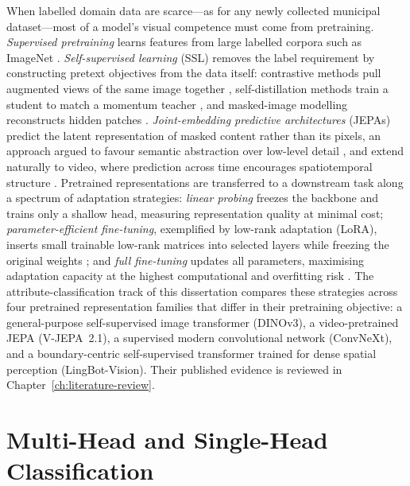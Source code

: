 When labelled domain data are scarce---as for any newly collected municipal dataset---most of a model's visual competence must come from pretraining. \emph{Supervised pretraining} learns features from large labelled corpora such as ImageNet \citep{deng2009imagenet,krizhevsky2012imagenet}. \emph{Self-supervised learning} (SSL) removes the label requirement by constructing pretext objectives from the data itself: contrastive methods pull augmented views of the same image together \citep{chen2020simple,he2020momentum}, self-distillation methods train a student to match a momentum teacher \citep{grill2020bootstrap,caron2021emerging}, and masked-image modelling reconstructs hidden patches \citep{he2022masked}. \emph{Joint-embedding predictive architectures} (JEPAs) predict the latent representation of masked content rather than its pixels, an approach argued to favour semantic abstraction over low-level detail \citep{lecun2022path,assran2023self}, and extend naturally to video, where prediction across time encourages spatiotemporal structure \citep{bardes2024revisiting}. Pretrained representations are transferred to a downstream task along a spectrum of adaptation strategies: \emph{linear probing} freezes the backbone and trains only a shallow head, measuring representation quality at minimal cost; \emph{parameter-efficient fine-tuning}, exemplified by low-rank adaptation (LoRA), inserts small trainable low-rank matrices into selected layers while freezing the original weights \citep{hu2022lora,houlsby2019parameter}; and \emph{full fine-tuning} updates all parameters, maximising adaptation capacity at the highest computational and overfitting risk \citep{yosinski2014transferable,kornblith2019better}. The attribute-classification track of this dissertation compares these strategies across four pretrained representation families that differ in their pretraining objective: a general-purpose self-supervised image transformer (DINOv3), a video-pretrained JEPA (V-JEPA~2.1), a supervised modern convolutional network (ConvNeXt), and a boundary-centric self-supervised transformer trained for dense spatial perception (LingBot-Vision). Their published evidence is reviewed in Chapter~\ref{ch:literature-review}.

\section{Multi-Head and Single-Head Classification}
\label{sec:bg-multihead}

